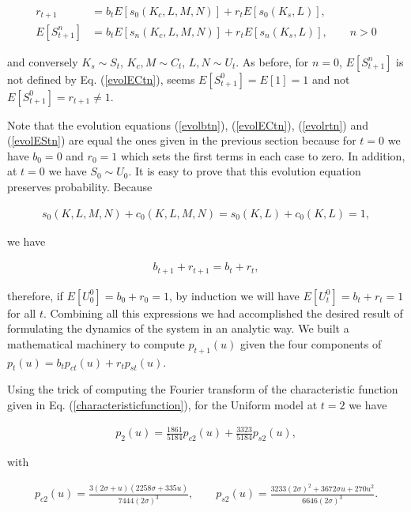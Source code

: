 \documentclass[12pt]{article}
\begin{document}
\begin{align}
    r_{t+1} & =b_{t}E[s_0(K_c,L,M,N)]+r_tE[s_0(K_s,L)],\label{evolrtn}\\
    E[S_{t+1}^n] & =b_{t}E[s_n(K_c,L,M,N)]+r_tE[s_n(K_s,L)],\qquad n>0\label{evolEStn}
\end{align}

\noindent and conversely $K_s\sim S_t$, $K_c,M\sim C_t$, $L,N\sim U_t$. As before, for $n=0$, $E[S_{t+1}^n]$ is not defined by Eq. (\ref{evolECtn}), seems $E[S_{t+1}^0]=E[1]=1$ and not $E[S_{t+1}^0]=r_{t+1}\neq1$.

Note that the evolution equations (\ref{evolbtn}), (\ref{evolECtn}), (\ref{evolrtn}) and (\ref{evolEStn}) are equal the ones given in the previous section because for $t=0$ we have $b_0=0$ and $r_0=1$ which sets the first terms in each case to zero. In addition, at $t=0$ we have $S_0\sim U_0$. It is easy to prove that this evolution equation preserves probability. Because

\begin{align}
    s_0(K,L,M,N)+c_0(K,L,M,N)=s_0(K,L)+c_0(K,L)=1,
\end{align}

\noindent we have

\begin{align}
    b_{t+1}+r_{t+1}=b_t+r_t,
\end{align}

\noindent therefore, if $E[U_0^0]=b_0+r_0=1$, by induction we will have $E[U_t^0]=b_t+r_t=1$ for all $t$. Combining all this expressions we had accomplished the desired result of formulating the dynamics of the system in an analytic way. We built a mathematical machinery to compute $p_{t+1}(u)$ given the four components of $p_t(u)=b_tp_{ct}(u)+r_tp_{st}(u)$.

Using the trick of computing the Fourier transform of the characteristic function given in Eq. (\ref{characteristicfunction}), for the Uniform model at $t=2$ we have

\begin{align}
    p_2(u)=\frac{1861}{5184}p_{c2}(u)+\frac{3323}{5184}p_{s2}(u),
    \label{p2}
\end{align}

\noindent with 

\begin{align}
    p_{c2}(u)=\frac{3 (2\sigma+u) (2258\sigma+335 u)}{7444(2\sigma)^3},\qquad p_{s2}(u)=\frac{3233 (2\sigma)^2+3672\sigma u+270 u^2}{6646(2\sigma)^3}.
\end{align}
\end{document}
